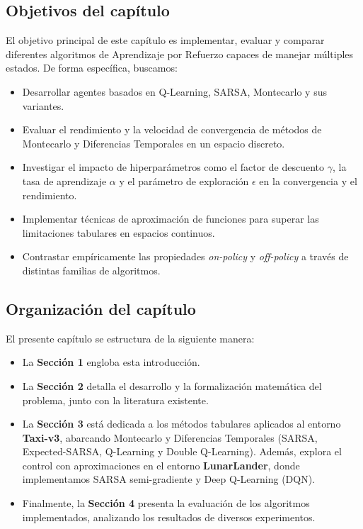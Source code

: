 \subsection{Objetivos del capítulo}
El objetivo principal de este capítulo es implementar, evaluar y comparar diferentes algoritmos de Aprendizaje por Refuerzo capaces de manejar múltiples estados. De forma específica, buscamos:
\begin{itemize}
    \item Desarrollar agentes basados en Q-Learning, SARSA, Montecarlo y sus variantes.
    \item Evaluar el rendimiento y la velocidad de convergencia de métodos de Montecarlo y Diferencias Temporales en un espacio discreto.
    \item Investigar el impacto de hiperparámetros como el factor de descuento $\gamma$, la tasa de aprendizaje $\alpha$ y el parámetro de exploración $\epsilon$ en la convergencia y el rendimiento.
    \item Implementar técnicas de aproximación de funciones para superar las limitaciones tabulares en espacios continuos.
    \item Contrastar empíricamente las propiedades \textit{on-policy} y \textit{off-policy} a través de distintas familias de algoritmos.
\end{itemize}

\subsection{Organización del capítulo}
El presente capítulo se estructura de la siguiente manera: 
\begin{itemize}
    \item La \textbf{Sección 1} engloba esta introducción.
    \item La \textbf{Sección 2} detalla el desarrollo y la formalización matemática del problema, junto con la literatura existente.
    \item La \textbf{Sección 3} está dedicada a los métodos tabulares aplicados al entorno \textbf{Taxi-v3}, abarcando Montecarlo y Diferencias Temporales (SARSA, Expected-SARSA, Q-Learning y Double Q-Learning). Además, explora el control con aproximaciones en el entorno \textbf{LunarLander}, donde implementamos SARSA semi-gradiente y Deep Q-Learning (DQN). 
    \item  Finalmente, la \textbf{Sección 4} presenta la evaluación de los algoritmos implementados, analizando los resultados de diversos experimentos.
\end{itemize}

